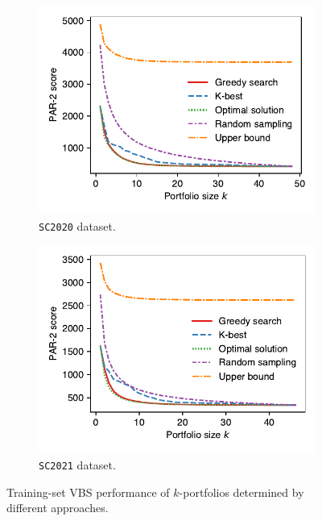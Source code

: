 \documentclass[runningheads]{llncs}
\begin{document}
\begin{figure}[htb]
	\centering
	\begin{subfigure}{0.49\columnwidth}
		\centering
		\includegraphics[width=\columnwidth, trim=0 15 0 10, clip]{plots/search-train-objective-2020.pdf}
		\caption{\texttt{SC2020} dataset.}
	\end{subfigure}
	\hfil
	\begin{subfigure}{0.49\columnwidth}
		\centering
		\includegraphics[width=\columnwidth, trim=0 15 0 10, clip]{plots/search-train-objective-2021.pdf}
		\caption{\texttt{SC2021} dataset.}
	\end{subfigure}
	\caption{Training-set VBS performance of $k$-portfolios determined by different approaches.}
	\label{fig:search-train-objective}
\end{figure}
\end{document}
